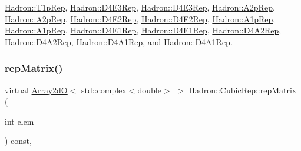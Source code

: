 \mbox{\hyperlink{structHadron_1_1T1pRep_ad013f454206c3e9f9b7c78db7812df97}{Hadron\+::\+T1p\+Rep}}, \mbox{\hyperlink{structHadron_1_1D4E3Rep_a313affd6d58648cb82e7095ada7afa8d}{Hadron\+::\+D4\+E3\+Rep}}, \mbox{\hyperlink{structHadron_1_1D4E3Rep_a313affd6d58648cb82e7095ada7afa8d}{Hadron\+::\+D4\+E3\+Rep}}, \mbox{\hyperlink{structHadron_1_1A2pRep_aeede31465f59cff568c2ada0aa32ac37}{Hadron\+::\+A2p\+Rep}}, \mbox{\hyperlink{structHadron_1_1A2pRep_aeede31465f59cff568c2ada0aa32ac37}{Hadron\+::\+A2p\+Rep}}, \mbox{\hyperlink{structHadron_1_1D4E2Rep_ae07926c0c41e03ed930683eb4e9be5f5}{Hadron\+::\+D4\+E2\+Rep}}, \mbox{\hyperlink{structHadron_1_1D4E2Rep_ae07926c0c41e03ed930683eb4e9be5f5}{Hadron\+::\+D4\+E2\+Rep}}, \mbox{\hyperlink{structHadron_1_1A1pRep_a23b801cc71ff71d666e68a3c065d3fae}{Hadron\+::\+A1p\+Rep}}, \mbox{\hyperlink{structHadron_1_1A1pRep_a23b801cc71ff71d666e68a3c065d3fae}{Hadron\+::\+A1p\+Rep}}, \mbox{\hyperlink{structHadron_1_1D4E1Rep_a8a0fcfa06e2a36d6835bab2431654a2f}{Hadron\+::\+D4\+E1\+Rep}}, \mbox{\hyperlink{structHadron_1_1D4E1Rep_a8a0fcfa06e2a36d6835bab2431654a2f}{Hadron\+::\+D4\+E1\+Rep}}, \mbox{\hyperlink{structHadron_1_1D4A2Rep_a278dadc5305417dfc7dd7a8e1ae642d4}{Hadron\+::\+D4\+A2\+Rep}}, \mbox{\hyperlink{structHadron_1_1D4A2Rep_a278dadc5305417dfc7dd7a8e1ae642d4}{Hadron\+::\+D4\+A2\+Rep}}, \mbox{\hyperlink{structHadron_1_1D4A1Rep_a4dca745781630db08cee88f37cae21b6}{Hadron\+::\+D4\+A1\+Rep}}, and \mbox{\hyperlink{structHadron_1_1D4A1Rep_a4dca745781630db08cee88f37cae21b6}{Hadron\+::\+D4\+A1\+Rep}}.

\mbox{\label{structHadron_1_1CubicRep_ac5d7e9e6f4ab1158b5fce3e4ad9e8005}} 
\subsubsection{\texorpdfstring{repMatrix()}{repMatrix()}\hspace{0.1cm}{\footnotesize\ttfamily [2/2]}}
{\footnotesize\ttfamily virtual \mbox{\hyperlink{classADAT_1_1Array2dO}{Array2dO}}$<$ std\+::complex$<$double$>$ $>$ Hadron\+::\+Cubic\+Rep\+::rep\+Matrix (\begin{DoxyParamCaption}\item[{int}]{elem }\end{DoxyParamCaption}) const\hspace{0.3cm}{\ttfamily [inline]}, {\ttfamily [virtual]}}



